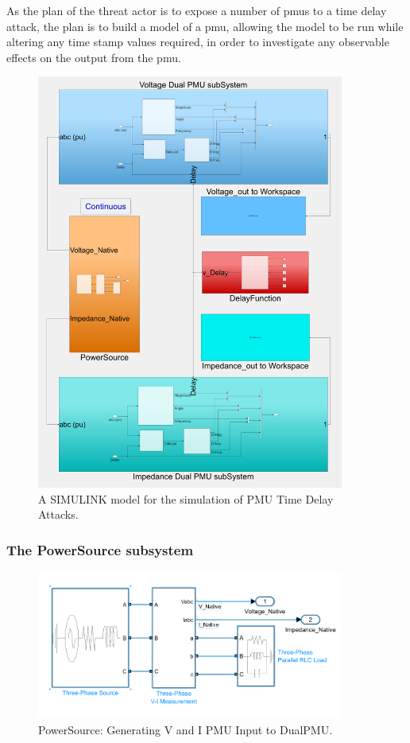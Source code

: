 As the plan of the threat actor is to expose  a number of \acrshort{pmu}s to a time  delay attack, the plan is to build a model of a \acrshort{pmu}, allowing the model to be run while altering any time stamp values required, in order to investigate any observable effects on the output from the \acrshort{pmu}.
 \begin{figure}[ht]
\centering
\includegraphics[width=0.9\textwidth]{figures/pmuSIM-overview.png}
\caption[PmuSIM SIMULINK model]{A SIMULINK model for the simulation of PMU Time Delay Attacks.}

\end{figure}


\subsubsection{The PowerSource subsystem}

 \begin{figure}[ht]
\centering
\includegraphics[width=0.9\textwidth]{figures/PowerSourceSubsystem.png}
\caption[PowerSource SIMULINK subsystem]{PowerSource: Generating  V and I PMU Input to DualPMU.}

\end{figure}

